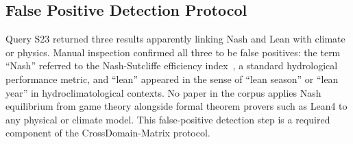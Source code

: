 \documentclass[12pt,a4paper]{article}
\begin{document}
\subsection{False Positive Detection Protocol}

Query S23 returned three results apparently linking Nash and Lean with
climate or physics. Manual inspection confirmed all three to be false
positives: the term ``Nash'' referred to the Nash-Sutcliffe efficiency
index~\citep{Nash1950}, a standard hydrological performance metric, and
``lean'' appeared in the sense of ``lean season'' or ``lean year'' in
hydroclimatological contexts. No paper in the corpus applies Nash
equilibrium from game theory alongside formal theorem provers such as
Lean4 to any physical or climate model. This false-positive detection
step is a required component of the CrossDomain-Matrix protocol.
\end{document}
